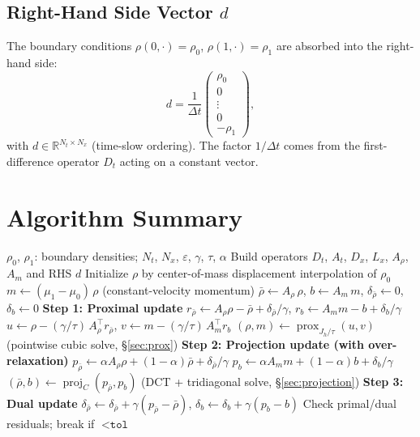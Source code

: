 \documentclass[11pt]{article}
\begin{document}
\subsection{Right-Hand Side Vector $d$}

The boundary conditions $\rho(0,\cdot) = \rho_0$, $\rho(1,\cdot) = \rho_1$
are absorbed into the right-hand side:
\begin{equation}
  d = \frac{1}{\Delta t}
  \begin{pmatrix} \rho_0 \\ 0 \\ \vdots \\ 0 \\ -\rho_1 \end{pmatrix},
  \label{eq:rhs}
\end{equation}
with $d \in \mathbb{R}^{N_t \times N_x}$ (time-slow ordering).  The
factor $1/\Delta t$ comes from the first-difference operator $D_t$ acting
on a constant vector.

\section{Algorithm Summary}

\begin{algorithm}[h]
\caption{Two-grid Linearized ADMM for the Schr\"{o}dinger Bridge}
\label{alg:admm}
\begin{algorithmic}[1]
\Require $\rho_0$, $\rho_1$: boundary densities; $N_t$, $N_x$, $\varepsilon$, $\gamma$, $\tau$, $\alpha$
\State Build operators $D_t$, $A_t$, $D_x$, $L_x$, $A_\rho$, $A_m$ and RHS $d$
\State Initialize $\rho$ by center-of-mass displacement interpolation of $\rho_0$
\State $m \leftarrow (\mu_1-\mu_0)\,\rho$ \quad (constant-velocity momentum)
\State $\bar\rho \leftarrow A_\rho\,\rho$, \quad $b \leftarrow A_m\,m$, \quad $\delta_{\bar\rho} \leftarrow 0$, \quad $\delta_b \leftarrow 0$
  \State \textbf{Step 1: Proximal update}
  \State $r_{\bar\rho} \leftarrow A_\rho\rho - \bar\rho + \delta_{\bar\rho}/\gamma$, \quad $r_b \leftarrow A_m m - b + \delta_b/\gamma$
  \State $u \leftarrow \rho - (\gamma/\tau)\,A_\rho^\top r_{\bar\rho}$, \quad $v \leftarrow m - (\gamma/\tau)\,A_m^\top r_b$
  \State $(\rho, m) \leftarrow \operatorname{prox}_{J_h/\tau}(u, v)$ \quad (pointwise cubic solve, \S\ref{sec:prox})
  \State \textbf{Step 2: Projection update (with over-relaxation)}
  \State $p_{\bar\rho} \leftarrow \alpha A_\rho\rho + (1-\alpha)\bar\rho + \delta_{\bar\rho}/\gamma$
  \State $p_b \leftarrow \alpha A_m m + (1-\alpha) b + \delta_b/\gamma$
  \State $(\bar\rho, b) \leftarrow \operatorname{proj}_C(p_{\bar\rho}, p_b)$ \quad (DCT + tridiagonal solve, \S\ref{sec:projection})
  \State \textbf{Step 3: Dual update}
  \State $\delta_{\bar\rho} \leftarrow \delta_{\bar\rho} + \gamma(p_{\bar\rho} - \bar\rho)$, \quad $\delta_b \leftarrow \delta_b + \gamma(p_b - b)$
  \State Check primal/dual residuals; break if $< \texttt{tol}$
\EndFor
\end{algorithmic}
\end{algorithm}
\end{document}

